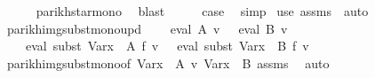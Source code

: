 \begin{isabellebody}
\ \ \ \ \isamarkupfalse%
\ parikh{\isacharunderscore}{\kern0pt}star{\isacharunderscore}{\kern0pt}mono\ \isamarkupfalse%
\ blast\isanewline
\ \ \isamarkupfalse%
\ \isamarkupfalse%
\ {\isacharquery}{\kern0pt}case\ \isamarkupfalse%
\ simp\isanewline
{}\isamarkupfalse%
\ {\isacharparenleft}{\kern0pt}use\ assms{\isacharparenleft}{\kern0pt}{}{\isacharparenright}{\kern0pt}\ \ auto{\isacharparenright}{\kern0pt}%
\endisatagproof
{\isafoldproof}%
%
\isadelimproof
\isanewline
%
\endisadelimproof
\isanewline
{}\isamarkupfalse%
\ parikh{\isacharunderscore}{\kern0pt}img{\isacharunderscore}{\kern0pt}subst{\isacharunderscore}{\kern0pt}mono{\isacharunderscore}{\kern0pt}upd{\isacharcolon}{\kern0pt}\isanewline
\ \ \ {\isachardoublequoteopen}{\isasymPsi}\ {\isacharparenleft}{\kern0pt}eval\ A\ v{\isacharparenright}{\kern0pt}\ {\isasymsubseteq}\ {\isasymPsi}\ {\isacharparenleft}{\kern0pt}eval\ B\ v{\isacharparenright}{\kern0pt}{\isachardoublequoteclose}\isanewline
\ \ \ {\isachardoublequoteopen}{\isasymPsi}\ {\isacharparenleft}{\kern0pt}eval\ {\isacharparenleft}{\kern0pt}subst\ {\isacharparenleft}{\kern0pt}Var{\isacharparenleft}{\kern0pt}x\ {\isacharcolon}{\kern0pt}{\isacharequal}{\kern0pt}\ A{\isacharparenright}{\kern0pt}{\isacharparenright}{\kern0pt}\ f{\isacharparenright}{\kern0pt}\ v{\isacharparenright}{\kern0pt}\ {\isasymsubseteq}\ {\isasymPsi}\ {\isacharparenleft}{\kern0pt}eval\ {\isacharparenleft}{\kern0pt}subst\ {\isacharparenleft}{\kern0pt}Var{\isacharparenleft}{\kern0pt}x\ {\isacharcolon}{\kern0pt}{\isacharequal}{\kern0pt}\ B{\isacharparenright}{\kern0pt}{\isacharparenright}{\kern0pt}\ f{\isacharparenright}{\kern0pt}\ v{\isacharparenright}{\kern0pt}{\isachardoublequoteclose}\isanewline
%
\isadelimproof
\ \ %
\endisadelimproof
%
\isatagproof
{}\isamarkupfalse%
\ parikh{\isacharunderscore}{\kern0pt}img{\isacharunderscore}{\kern0pt}subst{\isacharunderscore}{\kern0pt}mono{\isacharbrackleft}{\kern0pt}of\ {\isachardoublequoteopen}Var{\isacharparenleft}{\kern0pt}x\ {\isacharcolon}{\kern0pt}{\isacharequal}{\kern0pt}\ A{\isacharparenright}{\kern0pt}{\isachardoublequoteclose}\ v\ {\isachardoublequoteopen}Var{\isacharparenleft}{\kern0pt}x\ {\isacharcolon}{\kern0pt}{\isacharequal}{\kern0pt}\ B{\isacharparenright}{\kern0pt}{\isachardoublequoteclose}{\isacharbrackright}{\kern0pt}\ assms\ \isamarkupfalse%
\ auto%
\endisatagproof
{\isafoldproof}%

\end{isabellebody}
